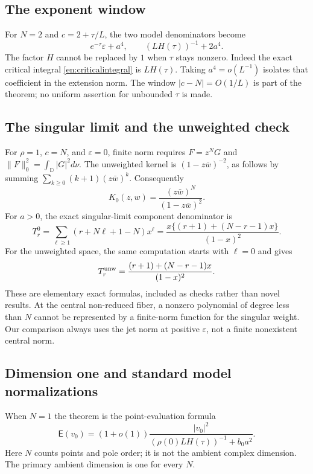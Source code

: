 \documentclass[12pt]{amsart}
\theoremstyle{definition}
\theoremstyle{remark}
\numberwithin{equation}{section}
\newcommand{\D}{\mathbb{D}}
\newcommand{\Cost}{\mathsf E}
\theoremstyle{definition}
\begin{document}
\subsection{The exponent window}
For $N=2$ and $c=2+\tau/L$, the two model denominators become
\[
 e^{-\tau}\varepsilon+a^4,
 \qquad (LH(\tau))^{-1}+2a^4.
\]
The factor $H$ cannot be replaced by $1$ when $\tau$ stays nonzero.
Indeed the exact critical integral \eqref{en:criticalintegral} is
$LH(\tau)$. Taking $a^4=o(L^{-1})$ isolates that coefficient in
the extension norm. The window $|c-N|=O(1/L)$ is part of the
theorem; no uniform assertion for unbounded $\tau$ is made.

\subsection{The singular limit and the unweighted check}
For $\rho=1$, $c=N$, and $\varepsilon=0$, finite norm requires
$F=z^NG$ and $\|F\|_{0}^2=\int_\D|G|^2d\nu$.
The unweighted kernel is $(1-z\bar w)^{-2}$, as follows by summing
$\sum_{k\ge0}(k+1)(z\bar w)^k$. Consequently
\begin{equation}\label{en:singularkernel}
 K_0(z,w)=\frac{(z\bar w)^N}{(1-z\bar w)^2}.
\end{equation}
For $a>0$, the exact singular-limit component denominator is
\begin{equation}\label{en:singularT}
 T_r^0=\sum_{\ell\ge1}(r+N\ell+1-N)x^\ell
 =\frac{x\{(r+1)+(N-r-1)x\}}{(1-x)^2}.
\end{equation}
For the unweighted space, the same computation starts with $\ell=0$
and gives
\begin{equation}\label{en:unweightedT}
 T_r^{\rm unw}=\frac{(r+1)+(N-r-1)x}{(1-x)^2}.
\end{equation}
These are elementary exact formulas, included as checks rather than
novel results. At the central non-reduced fiber, a nonzero polynomial
of degree less than $N$ cannot be represented by a finite-norm function
for the singular weight. Our comparison always uses the jet norm
at positive $\varepsilon$, not a finite nonexistent central norm.

\subsection{Dimension one and standard model normalizations}
When $N=1$ the theorem is the point-evaluation formula
\[
 \Cost(v_0)=(1+o(1))
 \frac{|v_0|^2}{(\rho(0)LH(\tau))^{-1}+b_0a^2}.
\]
Here $N$ counts points and pole order; it is not the ambient complex
dimension. The primary ambient dimension is one for every $N$.
\end{document}
